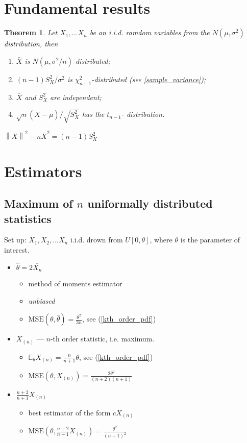 \documentclass[12pt]{article}
\newtheorem{theorem}{Theorem}[section]
\theoremstyle{definition}
\theoremstyle{remark}
\numberwithin{equation}{section}
\begin{document}
\begin{itemize}
\begin{itemize}
	\end{itemize}
\end{itemize}

\section{Fundamental results}
\begin{theorem}\label{normaliid}
	Let $X_1,\ldots X_n$ be an i.i.d. ramdom variables from the $N(\mu, \sigma^2)$ distribution, then
	\begin{enumerate}
		\item $\bar X$ is $N(\mu, \sigma^2/n)$ distributed;
		\item $(n-1)S_X^2/\sigma^2$ is $\chi^2_{n-1}$-distributed (see \ref{sample_variance});
		\item $\bar X$ and $S^2_{X}$ are independent;
		\item $\sqrt{n}(\bar{X} - \mu)/\sqrt{S_X^2}$ has the $t_{n-1}$- distribution.
	\end{enumerate}
\end{theorem}
\proof $\left\|X\right\|^2 - n \bar{X}^2 = (n-1)S_X^2$


\section{Estimators}

\subsection{Maximum of $n$ uniformally distributed statistics}

Set up: $X_1, X_2,\ldots X_n$ i.i.d. drown from $U[0, \theta]$, where $\theta$ is the parameter of interest.

\begin{itemize}
	\item $\hat\theta = 2\bar{X_n}$
	\begin{itemize}
		\item method of moments estimator
		\item \emph{unbiased}
		\item $\text{MSE}(\theta, \hat\theta) = \frac {\theta^2}{3n}$, see (\ref{kth_order_pdf})
	\end{itemize}
	\item $X_{(n)}$ --- $n$-th order statistic, i.e. maximum.
	\begin{itemize}
		\item $\mathbb{E}_\theta X_{(n)} = \frac{n}{n+1}\theta$, see (\ref{kth_order_pdf})
		\item $\text{MSE}(\theta, X_{(n)}) = \frac {2\theta^2}{(n+2)(n+1)}$
	\end{itemize}
	\item $\frac{n+2}{n+1}X_{(n)}$
	\begin{itemize}
		\item best estimator of the form $cX_{(n)}$
		\item $\text{MSE}(\theta, \frac{n+2}{n+1}X_{(n)}) = \frac {\theta^2}{(n+1)^2}$
	\end{itemize}
\end{itemize}
\end{document}
